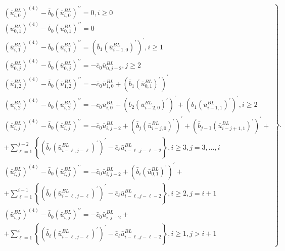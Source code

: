 \documentclass[12pt]{article}
\begin{document}
\begin{equation}
\left. 
\begin{array}{c}
\left(\bar{u}^{BL}_{i,0}\right)^{(4)}-\bar{b}_{0}\left(\bar{u}^{BL}_{i,0}\right)^{\prime \prime }=0,i\geq 0 \\
\left(\bar{u}^{BL}_{0,1}\right)^{(4)}-\bar{b}_{0}\left(\bar{u}^{BL}_{0,1}\right)^{\prime \prime }=0 \\
\left(\bar{u}^{BL}_{i,1}\right)^{(4)}-\bar{b}_{0}\left(\bar{u}^{BL}_{i,1}\right)^{\prime \prime }=\left( \bar{b}_{1}\left(\bar{u}^{BL}_{i-1,0}\right)^{\prime }\right) ^{\prime },i\geq 1 \\
\left(\bar{u}^{BL}_{0,j}\right)^{(4)}-\bar{b}_{0}\left(\bar{u}^{BL}_{0,j}\right)^{\prime \prime }=-\bar{c}_{0}\bar{u}^{BL}_{0,j-2},j\geq 2 \\
\left(\bar{u}^{BL}_{1,2}\right)^{(4)}-\bar{b}_{0}\left(\bar{u}^{BL}_{1,2}\right)^{\prime \prime }=-\bar{c}_{0}\bar{u}^{BL}_{1,0}+\left( \bar{b}_{1}\left(\bar{u}^{BL}_{0,1}\right)^{\prime }\right) ^{\prime } \\
\left(\bar{u}^{BL}_{i,2}\right)^{(4)}-\bar{b}_{0}\left(\bar{u}^{BL}_{i,2}\right)^{\prime \prime }=-\bar{c}_{0}\bar{u}^{BL}_{i,0}+\left( \bar{b}_{2}\left(\bar{u}^{BL}_{i-2,0}\right)^{\prime }\right) ^{\prime }+\left( \bar{b}_{1}\left(\bar{u}^{BL}_{i-1,1}\right)^{\prime }\right) ^{\prime },i\geq 2 \\
\left(\bar{u}^{BL}_{i,j}\right)^{(4)}-\bar{b}_{0}\left(\bar{u}^{BL}_{i,j}\right)^{\prime \prime }=-\bar{c}_{0}\bar{u}^{BL}_{i,j-2}+\left( \bar{b}_{j}\left(\bar{u}^{BL}_{i-j,0}\right)^{\prime }\right) ^{\prime }+\left( \bar{b}_{j-1}\left(\bar{u}^{BL}_{i-j+1,1}\right)^{\prime }\right) ^{\prime }+ \\
+\sum_{\ell =1}^{j-2}\left\{ \left( \bar{b}_{\ell}\left(\bar{u}^{BL}_{i-\ell ,j-\ell}\right)^{\prime }\right) ^{\prime }-\bar{c}_{\ell}\bar{u}^{BL}_{i-\ell ,j-\ell -2}\right\} ,i\geq 3,j=3,\ldots ,i \\
\left(\bar{u}^{BL}_{i,j}\right)^{(4)}-\bar{b}_{0}\left(\bar{u}^{BL}_{i,j}\right)^{\prime \prime }=-\bar{c}_{0}\bar{u}^{BL}_{i,j-2}+\left( \bar{b}_{i}\left(\bar{u}^{BL}_{0,1}\right)^{\prime }\right) ^{\prime }+ \\
+\sum_{\ell =1}^{i-1}\left\{ \left( \bar{b}_{\ell}\left(\bar{u}^{BL}_{i-\ell ,j-\ell}\right)^{\prime }\right) ^{\prime }-\bar{c}_{\ell}\bar{u}^{BL}_{i-\ell ,j-\ell -2}\right\} ,i\geq 2,j=i+1 \\
\left(\bar{u}^{BL}_{i,j}\right)^{(4)}-\bar{b}_{0}\left(\bar{u}^{BL}_{i,j}\right)^{\prime \prime }=-\bar{c}_{0}\bar{u}^{BL}_{i,j-2}+ \\
+\sum_{\ell =1}^{i}\left\{ \left( \bar{b}_{\ell}\left(\bar{u}^{BL}_{i-\ell ,j-\ell}\right)^{\prime }\right) ^{\prime }-\bar{c}_{\ell}\bar{u}^{BL}_{i-\ell ,j-\ell -2}\right\} ,i\geq 1,j>i+1
\end{array}%
\right\}.  \label{ubar_ij}
\end{equation}
\end{document}
